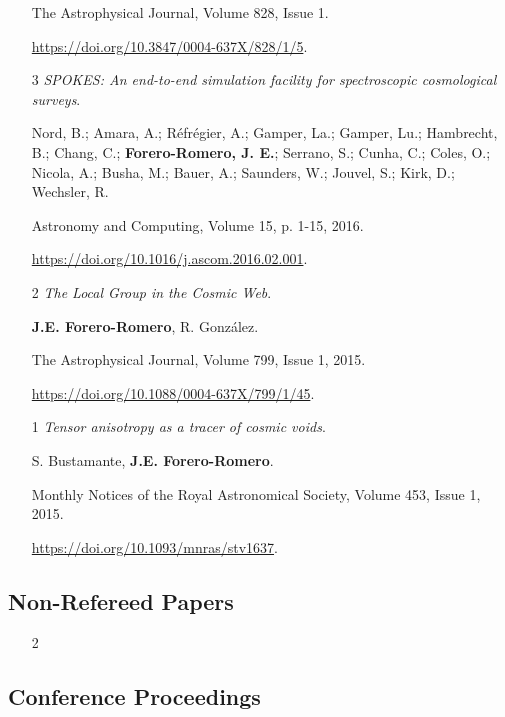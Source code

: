 \documentclass{article}
\begin{document}
\begin{itemize}
The Astrophysical Journal, Volume 828, Issue 1.

\url{https://doi.org/10.3847/0004-637X/828/1/5}.

\item[3]{\it SPOKES: An end-to-end simulation facility for
  spectroscopic cosmological surveys}.
 
	Nord, B.; Amara, A.; R\'efr\'egier, A.; Gamper, La.; Gamper, Lu.;
        Hambrecht, B.; Chang, C.; {\bf Forero-Romero, J. E.}; Serrano, S.;
        Cunha, C.; Coles, O.; Nicola, A.; Busha, M.; Bauer, A.;
        Saunders, W.; Jouvel, S.; Kirk, D.; Wechsler, R.

Astronomy and Computing, Volume 15, p. 1-15, 2016.

\url{https://doi.org/10.1016/j.ascom.2016.02.001}.

\item[2]{\it The Local Group in the Cosmic Web}.

{\bf J.E. Forero-Romero}, R. González.

The Astrophysical Journal, Volume 799, Issue 1, 2015.

\url{https://doi.org/10.1088/0004-637X/799/1/45}.

\item[1] {\it Tensor anisotropy as a tracer of cosmic voids}. 

S. Bustamante, {\bf J.E. Forero-Romero}. 

Monthly Notices of the Royal Astronomical Society, Volume 453, Issue 1, 2015.

\url{https://doi.org/10.1093/mnras/stv1637}.

\end{itemize}

\subsection{Non-Refereed Papers}

\begin{itemize}
\item[2]
\end{itemize}


\subsection{Conference Proceedings}
\end{document}
